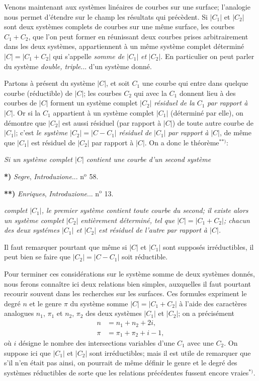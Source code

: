 \documentclass{article}
\begin{document}
Venons maintenant aux systèmes linéaires de courbes sur une surface; l'analogie nous permet d'étendre sur le champ les résultats qui précèdent. Si $|C_{1}|$ et $|C_{2}|$ sont deux systèmes complets de courbes sur une même surface, les courbes $C_{1} + C_{2}$, que l'on peut former en réunissant deux courbes prises arbitrairement dans les deux systèmes, appartiennent à un même système complet déterminé $|C| = |C_{1} + C_{2}|$ qui s'appelle \emph{somme de} $|C_{1}|$ \emph{et} $|C_{2}|$. En particulier on peut parler du système \emph{double, triple}... d'un système donné.

Partons à présent du système $|C|$, et soit $C_{1}$ une courbe qui entre dans quelque courbe (réductible) de $|C|$; les courbes $C_{2}$ qui avec la $C_{1}$ donnent lieu à des courbes de $|C|$ forment un système complet $|C_{2}|$ \emph{résiduel de la} $C_{1}$ \emph{par rapport à} $|C|$. Or si la $C_{1}$ appartient à un système complet $|C_{1}|$ (déterminé par elle), on démontre que $|C_{2}|$ est aussi résiduel (par rapport à $|C|$) de toute autre courbe de $|C_{1}|$; c'est \emph{le système} $|C_{2}| = |C - C_{1}|$ \emph{résiduel de} $|C_{1}|$ \emph{par rapport à} $|C|$, de même que $|C_{1}|$ est résiduel de $|C_{2}|$ par rapport à $|C|$. On a donc le théorème${}^{**)}$:

\emph{Si un système complet $|C|$ contient une courbe d'un second système}

\textbf{*)} \emph{Segre}, \emph{Introduzione}... n${}^{\text{o}}$ 58.

\textbf{**)} \emph{Enriques}, \emph{Introduzione}... n${}^{\text{o}}$ 13.

\emph{complet $|C_{1}|$, le premier système contient toute courbe du second; il existe alors un système complet $|C_{2}|$ entièrement déterminé, tel que $|C| = |C_{1} + C_{2}|$; chacun des deux systémes $|C_{1}|$ et $|C_{2}|$ est résiduel de l'autre par rapport à $|C|$.}

Il faut remarquer pourtant que même si $|C|$ et $|C_{1}|$ sont supposés irréductibles, il peut bien se faire que $|C_{2}| = |C - C_{1}|$ soit réductible.

Pour terminer ces considérations sur le système somme de deux systèmes donnés, nous ferons connaître ici deux relations bien simples, auxquelles il faut pourtant recourir souvent dans les recherches sur les surfaces. Ces formules expriment le degré $n$ et le genre $\pi$ du système somme $|C| = |C_{1} + C_{2}|$ à l'aide des caractères analogues $n_{1}$, $\pi_{1}$ et $n_{2}$, $\pi_{2}$ des deux systèmes $|C_{1}|$ et $|C_{2}|$; on a précisément
\[
\begin{aligned}
n &= n_{1} + n_{2} + 2i,\\
\pi &= \pi_{1} + \pi_{2} + i - 1,
\end{aligned}
\]
où $i$ désigne le nombre des intersections variables d'une $C_{1}$ avec une $C_{2}$. On suppose ici que $|C_{1}|$ et $|C_{2}|$ sont irréductibles; mais il est utile de remarquer que s'il n'en était pas ainsi, on pourrait de même définir le genre et le degré des systèmes réductibles de sorte que les relations précédentes fussent encore vraies${}^{*)}$.
\end{document}

